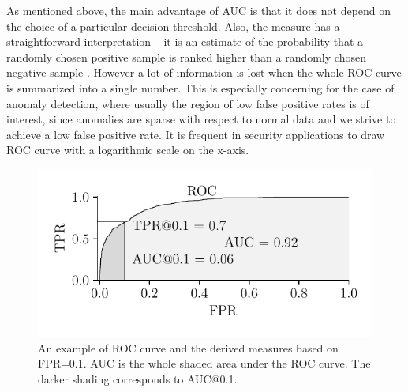 As mentioned above, the main advantage of AUC is that it does not depend on the choice of a particular decision threshold. Also, the measure has a straightforward interpretation -- it is an estimate of the probability that a randomly chosen positive sample is ranked higher than a randomly chosen negative sample \cite{hand2001simple}. However a lot of information is lost when the whole ROC curve is summarized into a single number. This is especially concerning for the case of anomaly detection, where usually the region of low false positive rates is of interest, since anomalies are sparse with respect to normal data and we strive to achieve a low false positive rate. It is frequent in security applications to draw ROC curve with a logarithmic scale on the x-axis.

\begin{figure}
\centering
\includegraphics[scale=0.85]{data/chapter_intro/fig_roc.pdf}
\caption{An example of ROC curve and the derived measures based on FPR=0.1. AUC is the whole shaded area under the ROC curve. The darker shading corresponds to AUC@0.1.}
\label{fig:ROC}
\end{figure}

